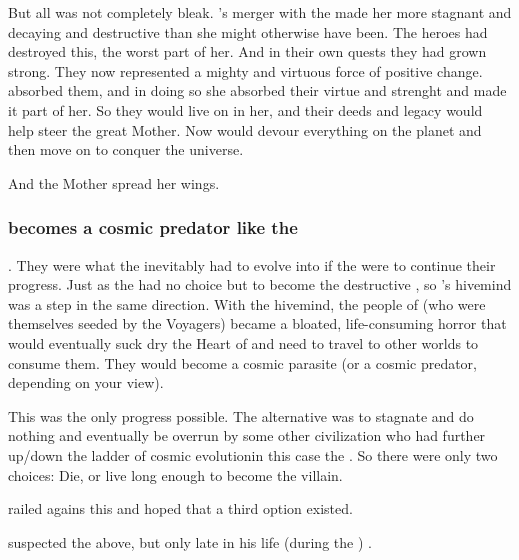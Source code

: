 But all was not completely bleak. 
\Tiamat's merger with the \banes made her more stagnant and decaying and destructive than she might otherwise have been.
The heroes had destroyed this, the worst part of her. 
And in their own quests they had grown strong.
They now represented a mighty and virtuous force of positive change. 
\Tiamat absorbed them, and in doing so she absorbed their virtue and strenght and made it part of her.
So they would live on in her, and their deeds and legacy would help steer the great Mother. 
Now \Tiamat would devour everything on the planet and then move on to conquer the universe. 

And the Mother spread her wings. 





\subsubsection{\Tiamat becomes a cosmic predator like the \banes}
. 
They were what the \voyagers inevitably had to evolve into if the \voyagers were to continue their progress. 
Just as the \voyagers had no choice but to become the destructive \banes, so \Tiamat's hivemind was a step in the same direction. 
With the hivemind, the people of \Miith (who were themselves seeded by the Voyagers) became a bloated, life-consuming horror that would eventually suck dry the Heart of \Miith and need to travel to other worlds to consume them. 
They would become a cosmic parasite (or a cosmic predator, depending on your view).

This was the only progress possible. 
The alternative was to stagnate and do nothing and eventually be overrun by some other civilization who had  further up/down the ladder of cosmic evolution\dash in this case the \banes. 
So there were only two choices: 
Die, or live long enough to become the villain. 

\Sethicus railed agains this and hoped that a third option existed. 

\Iscrafel suspected the above, but only late in his life (during the \thirdbanewar) . 










